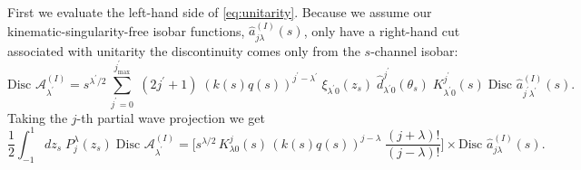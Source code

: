 \documentclass[10pt, aps,prd,amsmath,amssymb,superscriptaddress,onecolumn,
nofootinbib,showpacs,preprintnumbers]{revtex4-1}
\newcommand{\jpmax}{{j^\prime_\text{max}}}
\newcommand{\jp}{{j^\prime}}
\newcommand{\Disc}{\text{Disc }}
\newcommand{\lamp}{{\lambda^\prime}}
\begin{document}
First we evaluate the left-hand side of \cref{eq:unitarity}. Because we assume our kinematic-singularity-free isobar functions, \(\hat{a}^{(I)}_{j \lambda}(s)\), only have a right-hand cut associated with unitarity the discontinuity comes only from the \(s\)-channel isobar:
  \begin{equation}
    \label{eq:discontinuity}
    \Disc \mathcal{A}^{(I)}_\lamp = s^{\lamp/2}\, \sum_{j^\prime=0}^\jpmax \; (2 j^\prime +1) \; (k(s)q(s))^{j^\prime-\lamp}  \; \xi_{\lamp 0}(z_s)
    \; \hat{d}^{j^\prime}_{\lamp 0}(\theta_s) \; K^{j^\prime}_{\lamp0}(s) \; \Disc \hat{a}^{(I)}_{\jp \lamp}(s).
  \end{equation}
Taking the \(j\)-th partial wave projection we get
  \begin{equation}
    \label{eq:pw-disc}
    \frac{1}{2} \int_{-1}^1 dz_s \; P^\lambda_{j}(z_s) \; \Disc \mathcal{A}^{(I)}_\lamp =
    \bigg[ s^{\lambda/2} \, K^j_{\lambda 0}(s) \, (k(s)q(s))^{j-\lambda} \; \frac{(j+\lambda)!}{(j-
    \lambda)!} \bigg] \times \Disc \hat{a}^{(I)}_{j\lambda}(s).
  \end{equation}
\end{document}
